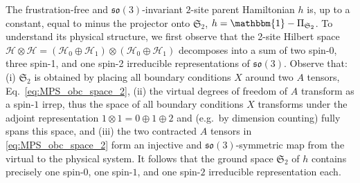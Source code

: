 \documentclass[a4paper]{article}
\newcommand{\id}{\mathbbm{1}}
\theoremstyle{definition}
\begin{document}
The  frustration-free and $\mathfrak{so}(3)$-invariant $2$-site parent Hamiltonian $h$ is,
up to a constant, equal to minus the projector onto  $\mathfrak S_2$, $h=\id-\Pi_{\mathfrak S_2}$.
To understand its physical structure, we first observe that the 2-site Hilbert space
$\mathcal H\otimes \mathcal H = (\mathcal H_0\oplus \mathcal H_1)\otimes (\mathcal
H_0\oplus \mathcal H_1)$ decomposes into a
sum of two spin-0, three spin-1, and one spin-2 irreducible representations of $\mathfrak{so}(3)$. Observe that: 
(i) $\mathfrak S_2$  is obtained by placing all boundary
conditions $X$ around two $A$ tensors, Eq.~\eqref{eq:MPS_obc_space_2}, 
(ii) the virtual degrees of freedom of $A$ transform as a spin-$1$ irrep, thus
the space of all boundary conditions $X$ transforms under the adjoint representation
$1\otimes 1=0\oplus 1\oplus 2$ and (e.g.\ by dimension counting) fully spans this space,
and (iii) the two contracted $A$ tensors in \eqref{eq:MPS_obc_space_2} form an
injective and $\mathfrak{so}(3)$-symmetric map from the virtual to the physical
system. It follows that the ground space $\mathfrak S_2$ of $h$ contains
precisely one spin-$0$, one spin-$1$, and one spin-$2$ irreducible
representation each. 
\end{document}
